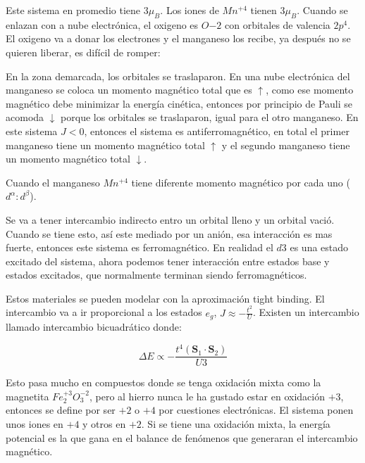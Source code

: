 \documentclass[11pt,fleqn]{book}
\renewcommand{\vec}[1]{\mathbf{#1}}
\begin{document}

Este sistema en promedio tiene $3\mu_{B}$. Los iones de $Mn^{+4}$ tienen $3\mu_{B}$. Cuando se enlazan con a nube electrónica, el oxigeno es $O{-2}$ con orbitales de valencia $2p^{4}$. El oxigeno va a donar los electrones y el manganeso los recibe, ya después no se quieren liberar, es difícil de romper:




En la zona demarcada, los orbitales se traslaparon. En una nube electrónica del manganeso se coloca un momento magnético total que es $\uparrow$, como ese momento magnético debe  minimizar la energía cinética, entonces por principio de Pauli se acomoda $\downarrow$ porque los orbitales se traslaparon, igual para el otro manganeso. En este sistema $J<0$, entonces el sistema es antiferromagnético, en total el primer manganeso tiene un momento magnético total $\uparrow$ y el segundo manganeso tiene un momento magnético total $\downarrow$. 

Cuando el manganeso $Mn^{+4}$ tiene diferente momento magnético por cada uno ($d^{\alpha}:d^{\beta}$). 

\begin{example}[$d^{5}:d^{3}$]


Se va a tener intercambio indirecto entro un orbital lleno y un orbital vació. Cuando se tiene esto, así este mediado por un anión, esa interacción es mas fuerte, entonces este sistema es ferromagnético. En realidad el $d{3}$ es una estado excitado del sistema, ahora podemos tener interacción entre estados base y estados excitados, que normalmente terminan siendo ferromagnéticos.
\end{example}

Estos materiales se pueden modelar con la aproximación tight binding. El intercambio va a ir proporcional a los estados $e_{g}$, $J\approx-\frac{t^{2}}{U}$. Existen un intercambio llamado intercambio bicuadrático donde:

\begin{equation}
    \Delta E\propto-\frac{t^{4}(\vec{S}_{1}\cdot\vec{S}_{2})}{U{3}}
    \label{Eq. 5.11}
\end{equation}

Esto pasa mucho en compuestos donde se tenga oxidación mixta como la magnetita $Fe_{2}^{+3}O_{3}^{-2}$, pero al hierro nunca le ha gustado estar en oxidación $+3$, entonces se define por ser $+2$ o $+4$ por cuestiones electrónicas. El sistema ponen unos iones en $+4$ y otros en $+2$. Si se tiene una oxidación mixta, la energía potencial es la que gana en el balance de fenómenos que generaran el intercambio magnético.
\end{document}
